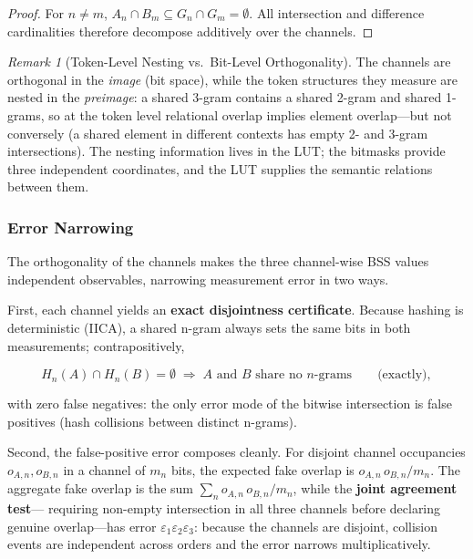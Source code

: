 \documentclass[11pt,a4paper]{article}
\theoremstyle{remark}
\newtheorem{remark}{Remark}[section]
\begin{document}
\begin{proof}
For $n \neq m$, $A_n \cap B_m \subseteq G_n \cap G_m = \emptyset$. All
intersection and difference cardinalities therefore decompose additively over
the channels.
\end{proof}

\begin{remark}[Token-Level Nesting vs.\ Bit-Level Orthogonality]
The channels are orthogonal in the \textit{image} (bit space), while the token
structures they measure are nested in the \textit{preimage}: a shared 3-gram
contains a shared 2-gram and shared 1-grams, so at the token level relational
overlap implies element overlap---but not conversely (a shared element in
different contexts has empty 2- and 3-gram intersections). The nesting
information lives in the LUT; the bitmasks provide three independent
coordinates, and the LUT supplies the semantic relations between them.
\end{remark}

\subsubsection{Error Narrowing}

The orthogonality of the channels makes the three channel-wise BSS values
independent observables, narrowing measurement error in two ways.

First, each channel yields an \textbf{exact disjointness certificate}. Because
hashing is deterministic (IICA), a shared n-gram always sets the same bits in
both measurements; contrapositively,

\begin{equation}
  H_n(A) \cap H_n(B) = \emptyset \;\Longrightarrow\;
  \text{$A$ and $B$ share no $n$-grams} \qquad \text{(exactly)},
\end{equation}

with zero false negatives: the only error mode of the bitwise intersection is
false positives (hash collisions between distinct n-grams).

Second, the false-positive error composes cleanly. For disjoint channel
occupancies $o_{A,n}, o_{B,n}$ in a channel of $m_n$ bits, the expected fake
overlap is $o_{A,n}\, o_{B,n} / m_n$. The aggregate fake overlap is the sum
$\sum_n o_{A,n}\, o_{B,n} / m_n$, while the \textbf{joint agreement test}---
requiring non-empty intersection in all three channels before declaring genuine
overlap---has error $\varepsilon_1 \varepsilon_2 \varepsilon_3$: because the
channels are disjoint, collision events are independent across orders and the
error narrows multiplicatively.
\end{document}

